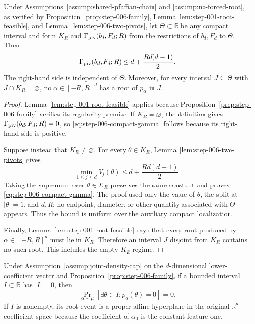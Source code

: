 \begin{proposition}
\label{prop:step-006-compact-gamma}
Under Assumptions~\ref{assump:shared-pfaffian-chain} and
\ref{assump:no-forced-root}, as verified by
Proposition~\ref{prop:step-006-family}, Lemma
\ref{lem:step-001-root-feasible}, and
Lemma~\ref{lem:step-006-two-pivots}, let
$\Theta\subset\mathbb R$ be any compact interval and form $K_R$ and
$\Gamma_{\rm piv}(b_d,F_d;R)$ from the restrictions of $b_d,F_d$ to
$\Theta$.  Then
\begin{equation}
\Gamma_{\rm piv}(b_d,F_d;R)
\leq d+\frac{Rd(d-1)}2.
\label{eq:step-006-compact-gamma}
\end{equation}
The right-hand side is independent of $\Theta$.  Moreover, for every
interval $J\subseteq\Theta$ with $J\cap K_R=\varnothing$, no
$\alpha\in[-R,R]^d$ has a root of $p_\alpha$ in $J$.
\end{proposition}

\begin{proof}
Lemma~\ref{lem:step-001-root-feasible} applies because
Proposition~\ref{prop:step-006-family} verifies its regularity premise.  If
$K_R=\varnothing$, the definition gives
$\Gamma_{\rm piv}(b_d,F_d;R)=0$, so
\eqref{eq:step-006-compact-gamma} follows because its right-hand side is
positive.

Suppose instead that $K_R\neq\varnothing$.  For every $\theta\in K_R$,
Lemma~\ref{lem:step-006-two-pivots} gives
\[
\min_{1\leq j\leq d}V_j(\theta)
\leq d+\frac{Rd(d-1)}2.
\]
Taking the supremum over $\theta\in K_R$ preserves the same constant and
proves \eqref{eq:step-006-compact-gamma}.  The proof used only the value of
$\theta$, the split at $|\theta|=1$, and $d,R$; no endpoint, diameter, or
other quantity associated with $\Theta$ appears.  Thus the bound is uniform
over the auxiliary compact localization.

Finally, Lemma~\ref{lem:step-001-root-feasible} says that every root produced
by $\alpha\in[-R,R]^d$ must lie in $K_R$.  Therefore an interval $J$
disjoint from $K_R$ contains no such root.  This includes the empty-$K_R$
regime.
\end{proof}

\begin{lemma}
\label{lem:step-006-zero-length}
Under Assumption~\ref{assump:joint-density-cap} on the $d$-dimensional
lower-coefficient vector and Proposition~\ref{prop:step-006-family}, if a
bounded interval $I\subset\mathbb R$ has $|I|=0$, then
\begin{equation}
\Pr_{\alpha\sim\mu}
[\exists\theta\in I:p_\alpha(\theta)=0]=0.
\label{eq:step-006-zero-length}
\end{equation}
If $I$ is nonempty, its root event is a proper affine hyperplane in the
original $\mathbb R^d$ coefficient space because the coefficient of
$\alpha_0$ is the constant feature one.
\end{lemma}

